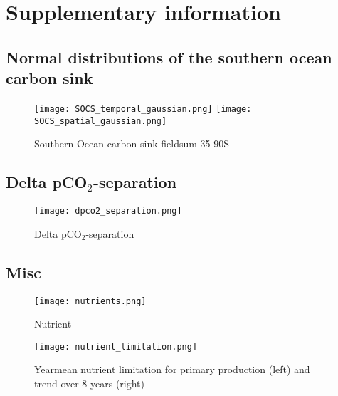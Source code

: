 \documentclass[12pt]{article}
\begin{document}
\newpage
\baselineskip18pt
%



\newpage

\section*{Supplementary information}

\subsection*{Normal distributions of the southern ocean carbon sink}
\begin{figure}[h]
\texttt{[image: SOCS\_temporal\_gaussian.png]} %
\texttt{[image: SOCS\_spatial\_gaussian.png]} %
\caption{Southern Ocean carbon sink fieldsum 35-90S}
\label{fig:SOCS_temporal_gaussian}
\end{figure}


\subsection*{Delta pCO$_2$-separation}
\begin{figure}[h]
\texttt{[image: dpco2\_separation.png]} %
\caption{Delta pCO$_2$-separation \citep{Takahashi2002}}
\label{fig:dpco2_separation}
\end{figure}

\subsection*{Misc}
\begin{figure}[h]
\texttt{[image: nutrients.png]} %
\caption{Nutrient}
\label{fig:nutrients}
\end{figure}


\begin{figure}
\texttt{[image: nutrient\_limitation.png]} %
\caption{Yearmean nutrient limitation for primary production (left) and trend over 8 years (right)}
\label{fig:nutrient_limitation}
\end{figure}
\end{document}
